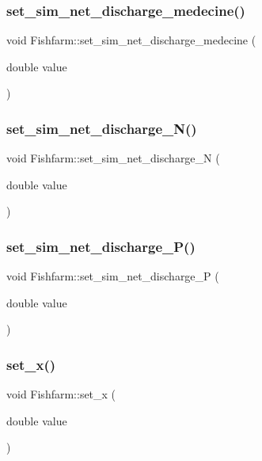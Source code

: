 \subsubsection{\texorpdfstring{set\_sim\_net\_discharge\_medecine()}{set\_sim\_net\_discharge\_medecine()}}
{\footnotesize\ttfamily void Fishfarm\+::set\+\_\+sim\+\_\+net\+\_\+discharge\+\_\+medecine (\begin{DoxyParamCaption}\item[{double}]{value }\end{DoxyParamCaption})}

\mbox{\label{class_fishfarm_a4e062b531c458e2fd6b310490b49129a}} 
\subsubsection{\texorpdfstring{set\_sim\_net\_discharge\_N()}{set\_sim\_net\_discharge\_N()}}
{\footnotesize\ttfamily void Fishfarm\+::set\+\_\+sim\+\_\+net\+\_\+discharge\+\_\+N (\begin{DoxyParamCaption}\item[{double}]{value }\end{DoxyParamCaption})}

\mbox{\label{class_fishfarm_ab557d77ad4d966825cfe5ceca55d32d0}} 
\subsubsection{\texorpdfstring{set\_sim\_net\_discharge\_P()}{set\_sim\_net\_discharge\_P()}}
{\footnotesize\ttfamily void Fishfarm\+::set\+\_\+sim\+\_\+net\+\_\+discharge\+\_\+P (\begin{DoxyParamCaption}\item[{double}]{value }\end{DoxyParamCaption})}

\mbox{\label{class_fishfarm_a4e8dfe97692937fd4fb70df9ca108548}} 
\subsubsection{\texorpdfstring{set\_x()}{set\_x()}}
{\footnotesize\ttfamily void Fishfarm\+::set\+\_\+x (\begin{DoxyParamCaption}\item[{double}]{value }\end{DoxyParamCaption})}

